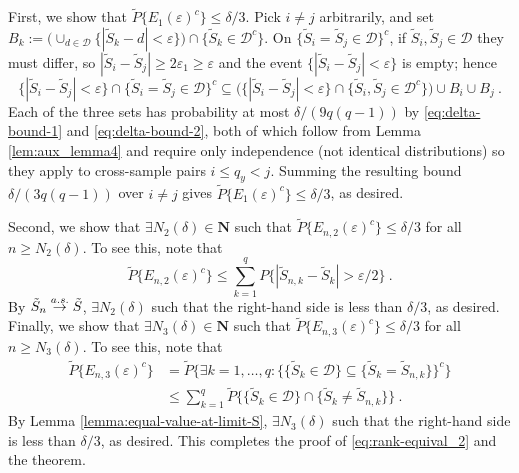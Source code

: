 \documentclass[11pt]{article}
\numberwithin{equation}{section}
\begin{document}
First, we show that $\tilde{P}\{E_{1}(\varepsilon)^{c}\}\le\delta/3$. Pick $i\neq j$
arbitrarily, and set $B_{k}:=\big(\cup_{d\in\mathcal{D}}\{|\tilde{S}_{k}-d|<\varepsilon\}\big)\cap\{\tilde{S}_{k}\in\mathcal{D}^{c}\}$.
On $\{\tilde{S}_{i}=\tilde{S}_{j}\in\mathcal{D}\}^{c}$, if $\tilde{S}_{i},\tilde{S}_{j}\in\mathcal{D}$
they must differ, so $|\tilde{S}_{i}-\tilde{S}_{j}|\ge2\varepsilon_{1}\ge\varepsilon$ and the event
$\{|\tilde{S}_{i}-\tilde{S}_{j}|<\varepsilon\}$ is empty; hence
\begin{equation*}
\{|\tilde{S}_{i}-\tilde{S}_{j}|<\varepsilon\}\cap\{\tilde{S}_{i}=\tilde{S}_{j}\in\mathcal{D}\}^{c}
\subseteq
\big(\{|\tilde{S}_{i}-\tilde{S}_{j}|<\varepsilon\}\cap\{\tilde{S}_{i},\tilde{S}_{j}\in\mathcal{D}^{c}\}\big)\cup B_{i}\cup B_{j}~.
\end{equation*}
Each of the three sets has probability at most $\delta/(9q(q-1))$ by \eqref{eq:delta-bound-1} and \eqref{eq:delta-bound-2}, both of which follow from Lemma \ref{lem:aux_lemma4} and require only independence (not identical
distributions) so they apply to cross-sample pairs $i\le q_{y}<j$. Summing the resulting bound
$\delta/(3q(q-1))$ over $i\neq j$ gives $\tilde{P}\{E_{1}(\varepsilon)^{c}\}\le\delta/3$, as desired.

Second, we show that $\exists N_{2}(\delta) \in \mathbf{N}$ such that $\tilde{P}\{ E_{n,2}(\varepsilon) ^{c}\} \leq \delta /3$ for all $n\geq N_{2}(\delta) $. To see this, note that
\begin{equation}
\tilde{P}\{ E_{n,2}(\varepsilon) ^{c}\} \leq \sum_{k=1}^{q}P\{|\tilde{S}_{n,k}-\tilde{S}_{k}|>\varepsilon /2\}~.
\end{equation}
By $\Tilde{S}_{n}\overset{a.s.}{\to }\Tilde{S}$, $\exists N_{2}(\delta) $ such that the right-hand side is less than $ \delta /3$, as desired. Finally, we show that $\exists N_{3}(\delta) \in \mathbf{N}$ such that $\tilde{P}\{ E_{n,3}(\varepsilon) ^{c}\} \leq \delta /3$ for all $n\geq N_{3}(\delta) $. To see this, note that
\begin{align*}
\tilde{P}\{ E_{n,3}(\varepsilon) ^{c}\} 
&=\tilde{P} \{ \exists k=1,\ldots ,q:\{ \{ \tilde{S}_{k}\in \mathcal{D}\} \subseteq \{ \tilde{S}_{k}=\tilde{S} _{n,k}\} \} ^{c}\} \\
&\leq \sum_{k=1}^{q}\tilde{P}\{ \{ \tilde{S}_{k}\in \mathcal{D}\} \cap\{ \tilde{S}_{k}\not=\tilde{S}_{n,k}\} \}~.
\end{align*}
By Lemma \ref{lemma:equal-value-at-limit-S}, $\exists N_{3}(\delta) $ such that the right-hand side is less than $\delta /3$, as desired. This completes the proof of \eqref{eq:rank-equival_2} and the theorem. 
\end{document}
